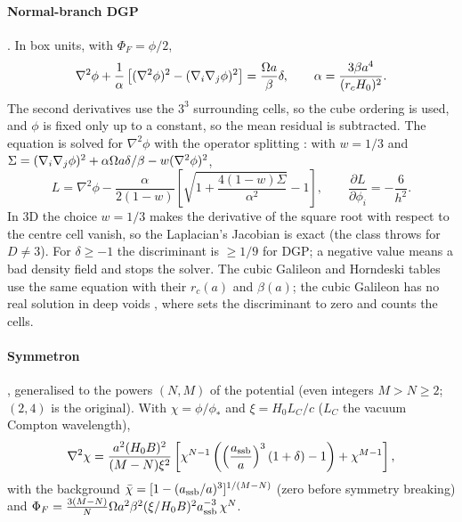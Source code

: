\paragraph*{Normal-branch DGP} \cite{Dvali2000,Schmidt2009,Li2013DGP}. In box units, with $\Phi_F=\phi/2$,
\begin{equation}
\nabla^2\phi+\frac1\alpha\left[(\nabla^2\phi)^2-(\nabla_i\nabla_j\phi)^2\right]=\frac{\Omega a}{\beta}\delta,\qquad
\alpha=\frac{3\beta a^4}{(r_cH_0)^2}.
\end{equation}
The second derivatives use the $3^3$ surrounding cells, so the cube ordering is used, and $\phi$ is fixed only up to a
constant, so the mean residual is subtracted. The equation is solved for $\nabla^2\phi$ with the operator splitting
\cite{Li2013DGP}: with $w=1/3$ and $\Sigma=(\nabla_i\nabla_j\phi)^2+\alpha\Omega a\delta/\beta-w(\nabla^2\phi)^2$,
\begin{equation}
L=\nabla^2\phi-\frac{\alpha}{2(1-w)}\left[\sqrt{1+\frac{4(1-w)\Sigma}{\alpha^2}}-1\right],\qquad
\frac{\partial L}{\partial\phi_i}=-\frac{6}{h^2}.
\end{equation}
In 3D the choice $w=1/3$ makes the derivative of the square root with respect to the centre cell vanish, so the Laplacian's
Jacobian is exact (the class throws for $D\ne3$). For $\delta\ge-1$ the discriminant is $\ge1/9$ for DGP; a negative value means a
bad density field and stops the solver. The cubic Galileon and Horndeski tables use the same equation with their $r_c(a)$
and $\beta(a)$; the cubic Galileon has no real solution in deep voids \cite{Barreira2013}, where
 sets the discriminant to zero and counts the cells.

\paragraph*{Symmetron} \cite{HinterbichlerKhoury2010,Brax2012}, generalised to the powers $(N,M)$ of the potential (even
integers $M>N\ge2$; $(2,4)$ is the original). With $\chi=\phi/\phi_*$ and $\xi=H_0L_C/c$ ($L_C$ the vacuum Compton
wavelength),
\begin{equation}
\nabla^2\chi=\frac{a^2(H_0B)^2}{(M-N)\xi^2}\left[\chi^{N-1}\left(\left(\frac{a_{\rm ssb}}{a}\right)^3(1+\delta)-1\right)+\chi^{M-1}\right],
\end{equation}
with the background $\bar\chi=[1-(a_{\rm ssb}/a)^3]^{1/(M-N)}$ (zero before symmetry breaking) and
$\Phi_F=\frac{3(M-N)}{N}\Omega a^2\beta^2(\xi/H_0B)^2a_{\rm ssb}^{-3}\,\chi^N$.

